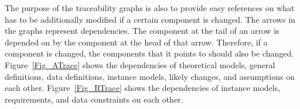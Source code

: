 \documentclass[12pt]{article}
\newcommand{\iref}[1]{IM\ref{#1}}
\newcommand{\ddref}[1]{DD\ref{#1}}
\begin{document}

The purpose of the traceability graphs is also to provide easy references on
what has to be additionally modified if a certain component is changed.  The
arrows in the graphs represent dependencies. The component at the tail of an
arrow is depended on by the component at the head of that arrow. Therefore, if a
component is changed, the components that it points to should also be
changed. Figure~\ref{Fig_ATrace} shows the dependencies of theoretical models,
general definitions, data definitions, instance models, likely changes, and
assumptions on each other. Figure~\ref{Fig_RTrace} shows the dependencies of
instance models, requirements, and data constraints on each other.
\end{document}
